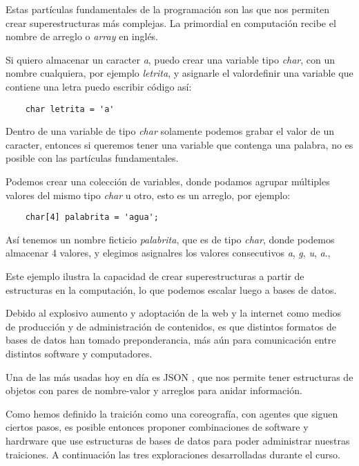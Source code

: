 \documentclass{article}
\begin{document}
Estas partículas fundamentales de la programación son las que nos permiten crear superestructuras más complejas. La primordial en computación recibe el nombre de arreglo o \textit{array} en inglés.

Si quiero almacenar un caracter \textit{a}, puedo crear una variable tipo \textit{char}, con un nombre cualquiera, por ejemplo \textit{letrita}, y asignarle el valordefinir  una variable que contiene una letra puedo escribir código así:

\begin{lstlisting}
    char letrita = 'a'
\end{lstlisting}

Dentro de una variable de tipo \textit{char} solamente podemos grabar el valor de un caracter, entonces si queremos tener una variable que contenga una palabra, no es posible con las partículas fundamentales.

Podemos crear una colección de variables, donde podamos agrupar múltiples valores del mismo tipo \textit{char} u otro, esto es un arreglo, por ejemplo:

\begin{lstlisting}
    char[4] palabrita = 'agua';
\end{lstlisting}

Así tenemos un nombre ficticio \textit{palabrita}, que es de tipo \textit{char}, donde podemos almacenar 4 valores, y elegimos asignalres los valores consecutivos \textit{a}, \textit{g}, \textit{u}, \textit{a}.,

Este ejemplo ilustra la capacidad de crear superestructuras a partir de estructuras en la computación, lo que podemos escalar luego a bases de datos.

Debido al explosivo aumento y adoptación de la web y la internet como medios de producción y de administración de contenidos, es que distintos formatos de bases de datos han tomado preponderancia, más aún para comunicación entre distintos software y computadores.

Una de las más usadas hoy en día es JSON \cite{json}, que nos permite tener estructuras de objetos con pares de nombre-valor y arreglos para anidar información.

Como hemos definido la traición como una coreografía, con agentes que siguen ciertos pasos, es posible entonces proponer combinaciones de software y hardrware que use estructuras de bases de datos para poder administrar nuestras traiciones. A continuación las tres exploraciones desarrolladas durante el curso.
\end{document}
